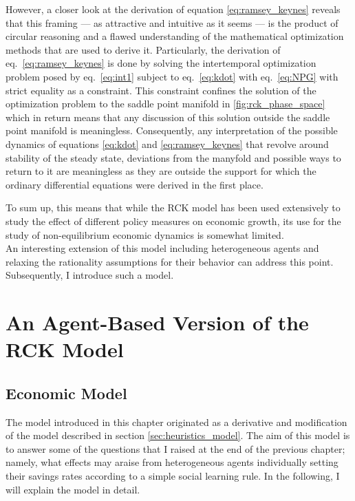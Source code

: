 However, a closer look at the derivation of equation \eqref{eq:ramsey_keynes} reveals that this framing --- as attractive and intuitive as it seems --- is the product of circular reasoning and a flawed understanding of the mathematical optimization methods that are used to derive it. Particularly, the derivation of eq.~\eqref{eq:ramsey_keynes} is done by solving the intertemporal optimization problem posed by eq.~\eqref{eq:int1} subject to eq.~\eqref{eq:kdot} with eq.~\eqref{eq:NPG} with strict equality as a constraint. This constraint confines the solution of the optimization problem to the saddle point manifold in \cref{fig:rck_phase_space} which in return means that any discussion of this solution outside the saddle point manifold is meaningless. Consequently, any interpretation of the possible dynamics of equations \eqref{eq:kdot} and \eqref{eq:ramsey_keynes} that revolve around stability of the steady state, deviations from the manyfold and possible ways to return to it are meaningless as they are outside the support for which the ordinary differential equations were derived in the first place.

To sum up, this means that while the RCK model has been used extensively to study the effect of different policy measures on economic growth, its use for the study of non-equilibrium economic dynamics is somewhat limited. \\

An interesting extension of this model including heterogeneous agents and relaxing the rationality assumptions for their behavior can address this point. Subsequently, I introduce such a model.




\section{An Agent-Based Version of the RCK Model}
\label{sec:savings_model}
\subsection{Economic Model}
The model introduced in this chapter originated as a derivative and modification of the model described in section \ref{sec:heuristics_model}. The aim of this model is to answer some of the questions that I raised at the end of the previous chapter; namely, what effects may araise from heterogeneous agents individually setting their savings rates according to a simple social learning rule. In the following, I will explain the model in detail.\\

